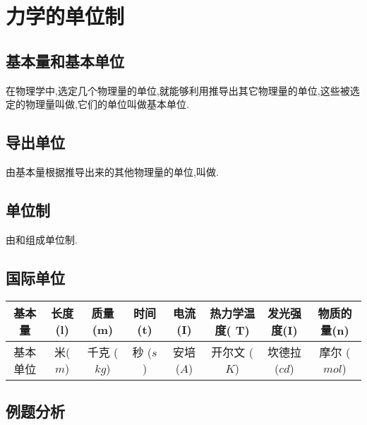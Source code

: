 \section{力学的单位制}
\subsection{基本量和基本单位}
在物理学中,选定几个物理量的单位,就能够利用推导出其它物理量的单位,这些被选定的物理量叫做,它们的单位叫做基本单位.

\subsection{导出单位}
由基本量根据推导出来的其他物理量的单位,叫做.

\subsection{单位制}
由和组成单位制.

  
\subsection{国际单位}
{\parindent=0pt\hfill
\begin{tabular}{|*{8}{c|}}
  \hline
  基本量 & 长度(l)& 质量 (m) & 时间 (t) & 电流(I) & { \small 热力学温度}(
  T) & {\small 发光强度}(I)& {\small 物质的量}(n)\\
  \hline
  {\small 基本单位} & 米($m$) & 千克 ($kg$) & 秒 ($s$) & 安培 ($A$) & 开尔文 ($K$) & 坎德拉($cd$)&摩尔 ($mol$)\\
  \hline
\end{tabular}
\hfil}

\subsection{例题分析}

